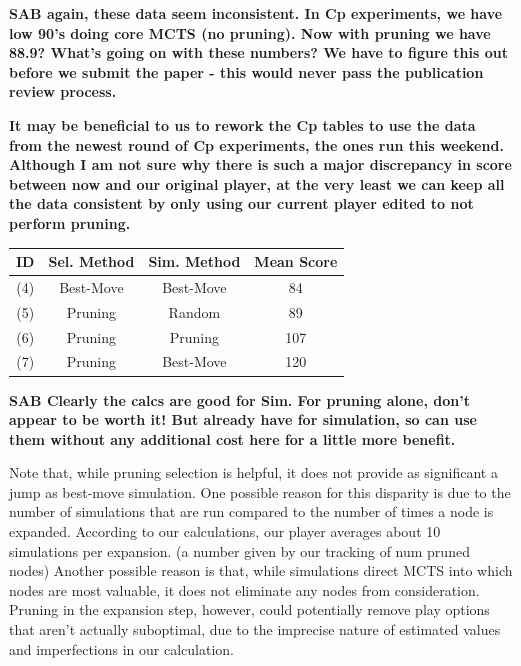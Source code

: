 \documentclass[letterpaper]{article}
\begin{document}
{\bf SAB again, these data seem inconsistent. In Cp experiments, we have low 90's doing core MCTS (no pruning). Now with pruning we have 88.9? What's going on with these numbers? We have to figure this out before we submit the paper - this would never pass the publication review process.}

{\bf It may be beneficial to us to rework the Cp tables to use the data from the newest round of Cp experiments, the ones run this weekend. Although I am not sure why there is such a major discrepancy in score between now and our original player, at the very least we can keep all the data consistent by only using our current player edited to not perform pruning.}

\begin{table}
\label{tbl:Selection}
\centering
\begin{tabular}{c c c c}
\hline
ID & Sel. Method & Sim. Method & Mean Score \\
\hline
(4) & Best-Move & Best-Move & 84 \\
(5) & Pruning & Random & 89 \\
(6) & Pruning & Pruning & 107 \\
(7) & Pruning & Best-Move & 120 \\
\hline
\end{tabular}
\end{table}

{\bf SAB Clearly the calcs are good for Sim. For pruning alone, don't appear to be worth it! But already have for simulation, so can use them without any additional cost here for a little more benefit.}

Note that, while pruning selection is helpful, it does not provide as significant a jump as best-move simulation. One possible reason for this disparity is due to the number of simulations that are run compared to the number of times a node is expanded. According to our calculations, our player averages about 10 simulations per expansion. (a number given by our tracking of num pruned nodes)  Another possible reason is that, while simulations direct MCTS into which nodes are most valuable, it does not eliminate any nodes from consideration. Pruning in the expansion step, however, could potentially remove play options that aren’t actually suboptimal, due to the imprecise nature of estimated values and imperfections in our calculation.
\end{document}
